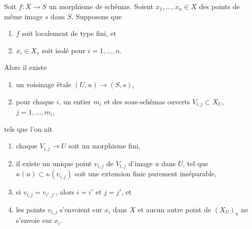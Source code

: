 \begin{lemma}
\label{lemma-etale-makes-quasi-finite-finite-multiple-points-var}
Soit $f : X \to S$ un morphisme de schémas.
Soient $x_1, \ldots, x_n \in X$ des points de même image $s$ dans $S$.
Supposons que
\begin{enumerate}
\item $f$ soit localement de type fini, et
\item $x_i \in X_s$ soit isolé pour $i = 1, \ldots, n$.
\end{enumerate}
Alors il existe
\begin{enumerate}
\item[(a)] un voisinage \'etale $(U, u) \to (S, s)$,
\item[(b)] pour chaque $i$, un entier $m_i$ et des
sous-schémas ouverts $V_{i, j} \subset X_U$, $j = 1, \ldots, m_i$,
\end{enumerate}
tels que l'on ait
\begin{enumerate}
\item[(\romannumeral1)] chaque $V_{i, j} \to U$ soit un morphisme fini,
\item[(\romannumeral2)] il existe un unique point $v_{i, j}$ de $V_{i, j}$
d'image $u$ dans $U$, tel que $\kappa(u) \subset \kappa(v_{i, j})$ soit
une extension finie purement inséparable,
\item[(\romannumeral4)] si $v_{i, j} = v_{i', j'}$, alors $i = i'$ et
$j = j'$, et
\item[(\romannumeral3)] les points $v_{i, j}$ s'envoient sur $x_i$ dans $X$ et
aucun autre point de $(X_U)_u$ ne s'envoie sur $x_i$.
\end{enumerate}
\end{lemma}

